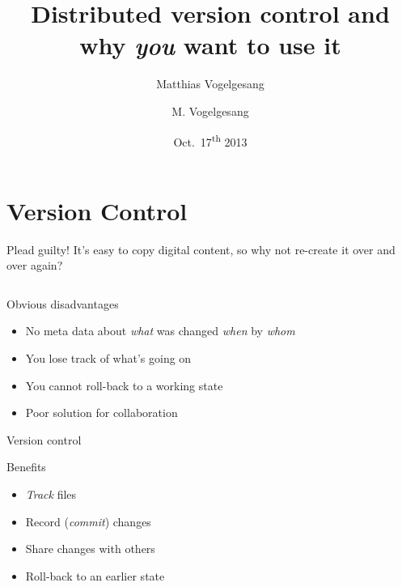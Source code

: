 \documentclass[18pt,mathserif]{beamer}
\title{Distributed version control and why \emph{you} want to use it}
\author{M. Vogelgesang}
\subtitle{Matthias Vogelgesang}
\institute{Institute for Data Processing and Electronics}
\date{Oct.~17\textsuperscript{th} 2013}
\begin{document}
\maketitle

\section{Version Control}

\begin{frame}{Plead guilty!}
  It's easy to copy digital content, so why not re-create it over and over
  again?

  \begin{columns}[onlytextwidth]

  \end{columns}
\end{frame}
\begin{frame}{Obvious disadvantages}
  \begin{itemize}
    \item No meta data about \emph{what} was changed \emph{when} by
      \emph{whom}
    \item You lose track of what's going on
    \item You cannot roll-back to a working state
    \item Poor solution for collaboration
  \end{itemize}
\end{frame}
\begin{frame}{Version control}
  \begin{block}{Benefits}
    \begin{itemize}
      \item \emph{Track} files
      \item Record (\emph{commit}) changes
      \item Share changes with others
      \item Roll-back to an earlier state
    \end{itemize}
  \end{block}
\end{frame}
\end{document}
